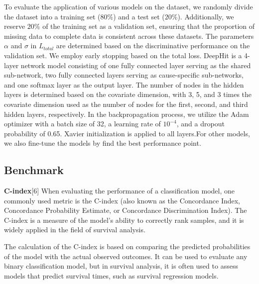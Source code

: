 \documentclass[conference]{IEEEconf}
\begin{document}
To evaluate the application of various models on the dataset, we randomly divide the dataset into a training set ($80\%$) and a test set ($20\%$). Additionally, we reserve $20\%$ of the training set as a validation set, ensuring that the proportion of missing data to complete data is consistent across these datasets. The parameters $\alpha$ and $\sigma$ in $L_{total}$ are determined based on the discriminative performance on the validation set. We employ early stopping based on the total loss. DeepHit is a 4-layer network model consisting of one fully connected layer serving as the shared sub-network, two fully connected layers serving as cause-specific sub-networks, and one softmax layer as the output layer. The number of nodes in the hidden layers is determined based on the covariate dimension, with 3, 5, and 3 times the covariate dimension used as the number of nodes for the first, second, and third hidden layers, respectively. In the backpropagation process, we utilize the Adam optimizer with a batch size of 32, a learning rate of $10^{-4}$, and a dropout probability of 0.65. Xavier initialization is applied to all layers.For other models, we also fine-tune the models by find the best performance point.

\subsection{Benchmark}

\textbf{C-index}[6] When evaluating the performance of a classification model, one commonly used metric is the C-index (also known as the Concordance Index, Concordance Probability Estimate, or Concordance Discrimination Index). The C-index is a measure of the model's ability to correctly rank samples, and it is widely applied in the field of survival analysis.

The calculation of the C-index is based on comparing the predicted probabilities of the model with the actual observed outcomes. It can be used to evaluate any binary classification model, but in survival analysis, it is often used to assess models that predict survival times, such as survival regression models.
\end{document}
